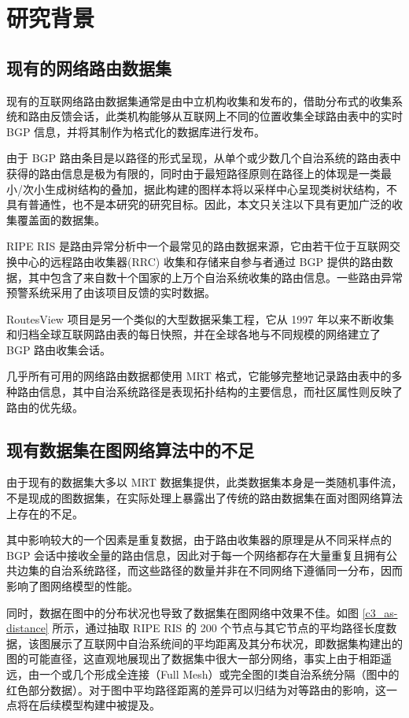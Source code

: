 \section{研究背景}


\subsection{现有的网络路由数据集}

现有的互联网络路由数据集通常是由中立机构收集和发布的，借助分布式的收集系统和路由反馈会话，此类机构能够从互联网上不同的位置收集全球路由表中的实时 BGP 信息，并将其制作为格式化的数据库进行发布。

由于 BGP 路由条目是以路径的形式呈现，从单个或少数几个自治系统的路由表中获得的路由信息是极为有限的，同时由于最短路径原则在路径上的体现是一类最小/次小生成树结构的叠加，据此构建的图样本将以采样中心呈现类树状结构，不具有普通性，也不是本研究的研究目标。因此，本文只关注以下具有更加广泛的收集覆盖面的数据集。

RIPE RIS 是路由异常分析中一个最常见的路由数据来源，它由若干位于互联网交换中心的远程路由收集器(RRC) 收集和存储来自参与者通过 BGP 提供的路由数据，其中包含了来自数十个国家的上万个自治系统收集的路由信息。一些路由异常预警系统采用了由该项目反馈的实时数据。

RoutesView 项目是另一个类似的大型数据采集工程，它从 1997 年以来不断收集和归档全球互联网路由表的每日快照，并在全球各地与不同规模的网络建立了 BGP 路由收集会话。

几乎所有可用的网络路由数据都使用 MRT 格式，它能够完整地记录路由表中的多种路由信息，其中自治系统路径是表现拓扑结构的主要信息，而社区属性则反映了路由的优先级。

\subsection{现有数据集在图网络算法中的不足}

由于现有的数据集大多以 MRT 数据集提供，此类数据集本身是一类随机事件流，不是现成的图数据集，在实际处理上暴露出了传统的路由数据集在面对图网络算法上存在的不足。

其中影响较大的一个因素是重复数据，由于路由收集器的原理是从不同采样点的 BGP 会话中接收全量的路由信息，因此对于每一个网络都存在大量重复且拥有公共边集的自治系统路径，而这些路径的数量并非在不同网络下遵循同一分布，因而影响了图网络模型的性能。

同时，数据在图中的分布状况也导致了数据集在图网络中效果不佳。如图 \ref{c3_as-distance} 所示，通过抽取 RIPE RIS 的 200 个节点与其它节点的平均路径长度数据，该图展示了互联网中自治系统间的平均距离及其分布状况，即数据集构建出的图的可能直径，这直观地展现出了数据集中很大一部分网络，事实上由于相距遥远，由一个或几个形成全连接（Full Mesh）或完全图的I类自治系统分隔（图中的红色部分数据）。对于图中平均路径距离的差异可以归结为对等路由的影响，这一点将在后续模型构建中被提及。

